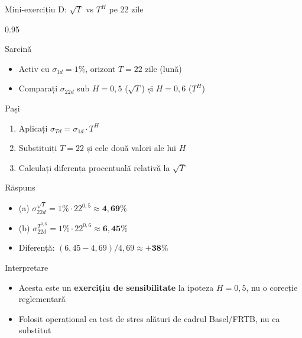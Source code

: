 \documentclass[9pt, aspectratio=169, t]{beamer}
\begin{document}
\begin{frame}[shrink=25]{Mini-exercițiu D: $\sqrt T$ vs $T^H$ pe 22 zile}
\begin{cminipage}{0.95\textwidth}
\begin{block}{Sarcină}
\begin{itemize}\setlength{\itemsep}{0pt}
    \item Activ cu $\sigma_{1d}=1\%$, orizont $T=22$ zile (lună)
    \item Comparați $\sigma_{22d}$ sub $H=0{,}5$ ($\sqrt T$) și $H=0{,}6$ ($T^H$)
\end{itemize}
\end{block}
\begin{block}{Pași}
\begin{enumerate}\setlength{\itemsep}{0pt}
    \item Aplicați $\sigma_{Td}=\sigma_{1d}\cdot T^H$
    \item Substituiți $T=22$ și cele două valori ale lui $H$
    \item Calculați diferența procentuală relativă la $\sqrt T$
\end{enumerate}
\end{block}
\begin{exampleblock}{Răspuns}
\begin{itemize}\setlength{\itemsep}{0pt}
    \item (a) $\sigma_{22d}^{\sqrt T}=1\%\cdot 22^{0{,}5}\approx \mathbf{4{,}69\%}$
    \item (b) $\sigma_{22d}^{T^{0{,}6}}=1\%\cdot 22^{0{,}6}\approx \mathbf{6{,}45\%}$
    \item Diferență: $(6{,}45-4{,}69)/4{,}69\approx \mathbf{+38\%}$
\end{itemize}
\end{exampleblock}
\begin{alertblock}{Interpretare}
\begin{itemize}\setlength{\itemsep}{0pt}
    \item Acesta este un \textbf{exercițiu de sensibilitate} la ipoteza $H=0{,}5$, nu o corecție reglementară
    \item Folosit operațional ca test de stres alături de cadrul Basel/FRTB, nu ca substitut
\end{itemize}
\end{alertblock}
\end{cminipage}
\end{frame}
\end{document}
